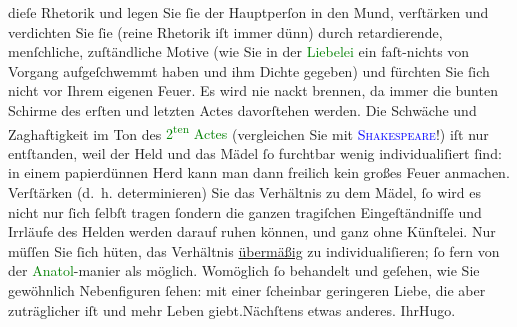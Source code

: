                     dieſe Rhetorik und legen Sie ſie der Hauptperſon in den Mund, verſtärken und
                    verdichten Sie ſie (reine Rhetorik iſt immer dünn) durch retardierende,
                    menſchliche, zuſtändliche Motive (wie Sie in der \textcolor{green}{Liebelei}{}\ledrightnote{\textcolor{green}{Liebelei. Schauspiel in drei Akten}} ein faſt-nichts von Vorgang aufgeſchwemmt haben und ihm
                    Dichte gegeben) {\pb}und fürchten
                    Sie ſich nicht vor Ihrem eigenen Feuer. Es wird nie nackt brennen, da immer die
                    bunten Schirme des erſten und letzten Actes davorſtehen werden. Die Schwäche und
                    Zaghaftigkeit im Ton des \textcolor{green}{2\textsuperscript{ten} Actes}{} (vergleichen Sie mit \textcolor{blue}{\textsc{Shakeſpeare}}{}\ledrightnote{\textcolor{blue}{William Shakespeare}}!) iſt nur entſtanden, weil der Held und das Mädel ſo furchtbar wenig
                    individualiſiert ſind: in einem papierdünnen Herd kann man dann freilich kein
                    großes Feuer anmachen. {\pb}Verſtärken \introOben{}(d. h. determinieren)\introOben{}
               Sie das Verhältnis
                    zu dem Mädel, ſo wird es nicht nur ſich ſelbſt tragen ſondern die ganzen
                    tragiſchen Eingeſtändniſſe und Irrläufe des Helden werden darauf ruhen können,
                    und ganz ohne Künſtelei. Nur müſſen Sie ſich hüten, das Verhältnis \uline{übermäßig} zu individualiſieren; ſo fern von der
                        \textcolor{green}{Anatol}{}\ledrightnote{\textcolor{green}{Anatol}}-manier als möglich.\pend
           \pstart
           Womöglich ſo behandelt und geſehen, wie Sie gewöhnlich Nebenfiguren ſehen: mit
                    einer ſcheinbar geringeren Liebe, die aber zuträglicher iſt und mehr Leben
                        giebt.\hspace*{2.5em}Nächſtens etwas anderes.\pend
           \pstart Ihr\spacefill\mbox{Hugo.}\pend{}\endnumbering{}  
      